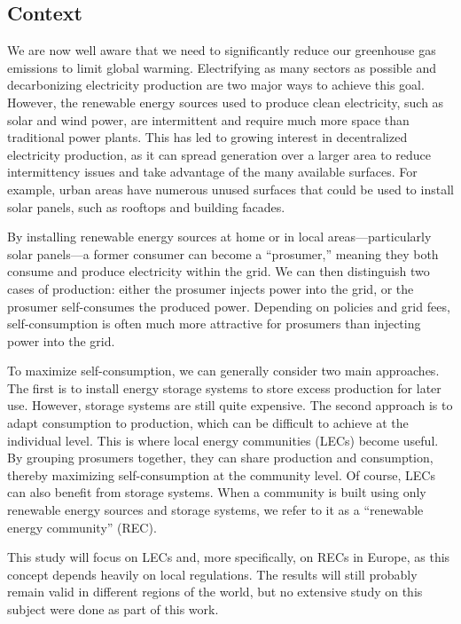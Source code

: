 \subsection{Context}

We are now well aware that we need to significantly reduce our greenhouse gas emissions to limit global warming. Electrifying as many sectors as possible and decarbonizing electricity production are two major ways to achieve this goal. However, the renewable energy sources used to produce clean electricity, such as solar and wind power, are intermittent and require much more space than traditional power plants. This has led to growing interest in decentralized electricity production, as it can spread generation over a larger area to reduce intermittency issues and take advantage of the many available surfaces. For example, urban areas have numerous unused surfaces that could be used to install solar panels, such as rooftops and building facades.

By installing renewable energy sources at home or in local areas—particularly solar panels—a former consumer can become a “prosumer,” meaning they both consume and produce electricity within the grid. We can then distinguish two cases of production: either the prosumer injects power into the grid, or the prosumer self-consumes the produced power. Depending on policies and grid fees, self-consumption is often much more attractive for prosumers than injecting power into the grid.

To maximize self-consumption, we can generally consider two main approaches. The first is to install energy storage systems to store excess production for later use. However, storage systems are still quite expensive. The second approach is to adapt consumption to production, which can be difficult to achieve at the individual level. This is where local energy communities (LECs) become useful. By grouping prosumers together, they can share production and consumption, thereby maximizing self-consumption at the community level. Of course, LECs can also benefit from storage systems. When a community is built using only renewable energy sources and storage systems, we refer to it as a “renewable energy community” (REC).

This study will focus on LECs and, more specifically, on RECs in Europe, as this concept depends heavily on local regulations. The results will still probably remain valid in different regions of the world, but no extensive study on this subject were done as part of this work.

